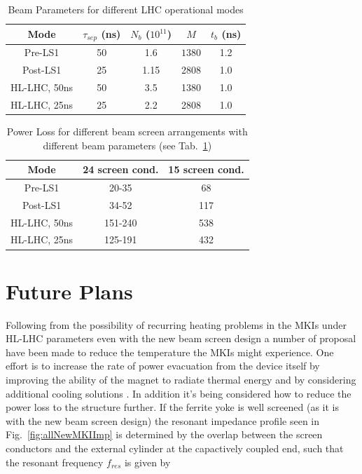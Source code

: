 \documentclass[a4paper,
              ]{jacow}
\begin{document}
\begin{table}
\caption{Beam Parameters for different LHC operational modes}
\label{tab:beamPara}
\begin{center}
\begin{tabular}{c | c | c | c | c}
Mode & $\tau_{sep}$ (ns) & $N_{b}$ ($10^{11}$) & $ M $ & $t_{b}$ (ns) \\ \hline 
Pre-LS1 & 50 & 1.6 & $ 1380 $ & 1.2 \\ \hline 
Post-LS1 & 25 & 1.15 & 2808 & 1.0 \\ \hline 
HL-LHC, 50ns & 50 & 3.5 & 1380 & 1.0 \\ \hline 
HL-LHC, 25ns & 25 & 2.2 & 2808 & 1.0 \\ 
\end{tabular}
\end{center}
\end{table}

\begin{table}
\caption{Power Loss for different beam screen arrangements with different beam parameters (see Tab.~\ref{tab:beamPara})}
\label{tab:powLoss}
\begin{center}
\begin{tabular}{c | c | c}
Mode & 24 screen cond. & 15 screen cond. \\ \hline 
Pre-LS1 & 20-35 & 68 \\ \hline 
Post-LS1 & 34-52 & 117 \\ \hline 
HL-LHC, 50ns & 151-240 & 538  \\ \hline 
HL-LHC, 25ns & 125-191 & 432  \\ 
\end{tabular}
\end{center}
\end{table}

\section{Future Plans}

Following from the possibility of recurring heating problems in the MKIs under HL-LHC parameters even with the new beam screen design a number of proposal have been made to reduce the temperature the MKIs might experience. One effort is to increase the rate of power evacuation from the device itself by improving the ability of the magnet to radiate thermal energy and by considering additional cooling solutions \cite{mkiCooling}. In addition it's being considered how to reduce the power loss to the structure further. If the ferrite yoke is well screened (as it is with the new beam screen design) the resonant impedance profile seen in Fig.~\ref{fig:allNewMKIImp} is determined by the overlap between the screen conductors and the external cylinder at the capactively coupled end, such that the resonant frequency $f_{res}$ is given by
\end{document}
